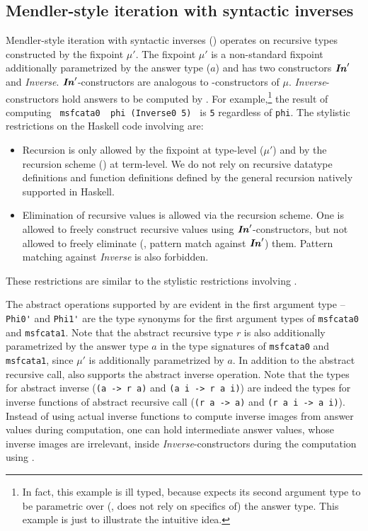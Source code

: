 \begin{figure}

\vspace*{-3ex}
\end{figure}


\subsection{Mendler-style iteration with syntactic inverses}
\label{sec:mendler:sf}
Mendler-style iteration with syntactic inverses (\msfit{}) operates on
recursive types constructed by the fixpoint $\mu'$. The fixpoint $\mu'$
is a non-standard fixpoint additionally parametrized by the answer type ($a$)
and has two constructors $\textbf{\textit{In}}_{}'$ and \textit{Inverse}. $\textbf{\textit{In}}_{}'$-constructors
are analogous to \In{}-constructors of $\mu$. \textit{Inverse}-constructors
hold answers to be computed by \msfit{}. For example,\footnote{
	In fact, this example is ill typed, because \msfit{} expects
	its second argument type to be parametric over
	(\ie, does not rely on specifics of) the answer type.
	This example is just to illustrate the intuitive idea.}
the result of computing \lstinline{ msfcata0  phi (Inverse0 5) }
is \lstinline{5} regardless of \lstinline{phi}.
The stylistic restrictions on the Haskell code involving \msfit{} are:
\begin{itemize}
\item Recursion is only allowed by the fixpoint at type-level ($\mu'$)
and by the recursion scheme (\msfit{}) at term-level.
We do not rely on recursive datatype definitions and function definitions
defined by the general recursion natively supported in Haskell.
\item Elimination of recursive values is allowed via the recursion scheme.
One is allowed to freely construct recursive values using $\textbf{\textit{In}}_{}'$-constructors,
but not allowed to freely eliminate (\ie, pattern match against $\textbf{\textit{In}}_{}'$) them.
Pattern matching against \textit{Inverse} is also forbidden.
\end{itemize}
These restrictions are similar to the stylistic restrictions involving \MIt{}.


The abstract operations supported by \msfit{} are evident
in the first argument type -- \lstinline{Phi0'} and \lstinline{Phi1'}
are the type synonyms for the first argument types of \lstinline{msfcata0}
and \lstinline{msfcata1}. Note that the abstract recursive type $r$ is also
additionally parametrized by the answer type $a$ in the type signatures
of \lstinline{msfcata0} and \lstinline{msfcata1}, since $\mu'$ is additionally
parametrized by $a$. In addition to the abstract recursive call, \msfit{}
also supports the abstract inverse operation. Note that the types for
abstract inverse (\lstinline{(a -> r a)} and \lstinline{(a i -> r a i)})
are indeed the types for inverse functions of abstract recursive call
(\lstinline{(r a -> a)} and \lstinline{(r a i -> a i)}). Instead of using
actual inverse functions to compute inverse images from answer values
during computation, one can hold intermediate answer values, whose inverse
images are irrelevant, inside \textit{Inverse}-constructors during
the computation using \msfit{}.

